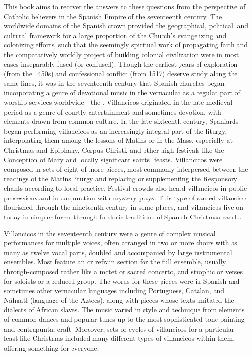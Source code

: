 This book aims to recover the answers to these questions from the perspective
of Catholic believers in the Spanish Empire of the seventeenth century.
The worldwide domains of the Spanish crown provided the geographical,
political, and cultural framework for a large proportion of the Church's
evangelizing and colonizing efforts, such that the seemingly spiritual work of
propagating faith and the comparatively worldly project of building colonial
civilization were in most cases inseparably fused (or confused). 
Though the earliest years of exploration (from the 1450s) and confessional
conflict (from 1517) deserve study along the same lines, it was in the
seventeenth century that Spanish churches began incorporating a genre of
devotional music in the vernacular as a regular part of worship services
worldwide---the .
Villancicos originated in the late medieval period as a genre of courtly 
entertainment and sometimes devotion, with elements drawn from common culture.
In the late sixteenth century, Spaniards began performing villancicos as an 
increasingly integral part of the liturgy, interpolating them among the lessons 
of Matins or in the Mass, especially at Christmas and Epiphany, Corpus Christi, 
and other high festivals like the Conception of Mary and locally significant
saints' feasts.
Villancicos were composed in sets of eight of more pieces, most commonly
interpersed between the readings of the Matins liturgy and replacing or
supplementing the Responsory chants according to local practice.
Festival crowds also heard villancicos in public processions and in conjunction
with mystery plays. 
This type of sacred villancico flourished through the nineteenth century in
some places, and villancicos live on today in simpler forms through folkloric
traditions of Spanish Christmas carols.

Villancicos in the seventeenth century were a genre of complex musical
performances for multiple voices, often arranged in two or more choirs with as
many as twelve vocal parts, doubled and accompanied by large instrumental
ensembles.
Most feature an  or refrain section for the full ensemble,
usually through-composed rather like a motet or sacred concerto, and strophic
 or verses for soloists or a reduced group.
The words for these pieces were in Spanish and sometimes other vernacular
languages including Portuguese, Catalan, and Náhuatl (language of the Aztecs),
along with pieces whose texts imitated the dialects of African slaves.
The music varied in style and technique from elements of common dances
and popular tunes up to the most sophisticated tone-painting and contrapuntal
craft.
Moreover, sets or cycles of villancicos for a particular feast like Christmas
included many different types of villancicos within them, offering something
for everyone.

